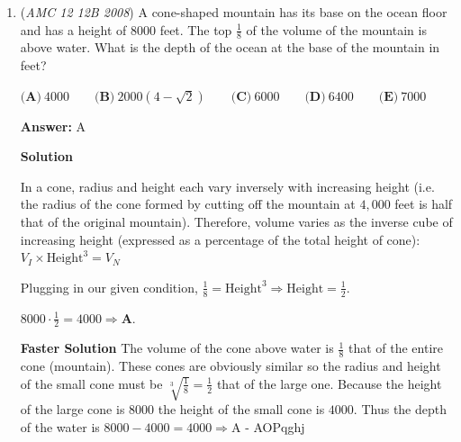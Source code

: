 \begin{enumerate}
 $\textbf{(A)}\ 500 \qquad \textbf{(B)}\ 900 \qquad \textbf{(C)}\ 950 \qquad \textbf{(D)}\ 1000 \qquad \textbf{(E)}\ 1900$

 \textbf{Answer: }B



\textbf{Solution}

Let $h$ be the number of bricks in the chimney. 

 Without talking, Brenda and Brandon lay $\frac{h}{9}$ and $\frac{h}{10}$ bricks per hour respectively, so together they lay $\frac{h}{9}+\frac{h}{10}-10$ per hour together. 

 Since they finish the chimney in $5$ hours, $h=5\left( \frac{h}{9}+\frac{h}{10}-10 \right)$. Thus, $h=900 \Rightarrow B$.

 


	\item (\textit{AMC 12 12B 2008}) A cone-shaped mountain has its base on the ocean floor and has a height of 8000 feet. The top $\frac{1}{8}$ of the volume of the mountain is above water. What is the depth of the ocean at the base of the mountain in feet?


 $\textbf{(A)}\ 4000 \qquad \textbf{(B)}\ 2000(4-\sqrt{2}) \qquad \textbf{(C)}\ 6000 \qquad \textbf{(D)}\ 6400 \qquad \textbf{(E)}\ 7000$

 \textbf{Answer: }A



\textbf{Solution}

In a cone, radius and height each vary inversely with increasing height (i.e. the radius of the cone formed by cutting off the mountain at $4,000$ feet is half that of the original mountain). Therefore, volume varies as the inverse cube of increasing height (expressed as a percentage of the total height of cone):$V_I\times \text{Height}^3 = V_N$

 Plugging in our given condition, $\frac{1}{8} = \text{Height}^3 \Rightarrow \text{Height} = \frac{1}{2}$.  

 $8000\cdot\frac{1}{2}=4000 \Rightarrow \boxed{\textbf{A}}$.

 \textbf{Faster Solution} The volume of the cone above water is $\frac 1 8$ that of the entire cone (mountain). These cones are obviously similar so the radius and height of the small cone must be $\sqrt[3]{\frac1 8}= \frac 1 2$ that of the large one. Because the height of the large cone is $8000$ the height of the small cone is $4000$. Thus the depth of the water is $8000-4000 = 4000 \Rightarrow\boxed{\text{A}}$ - AOPqghj


\end{enumerate}
